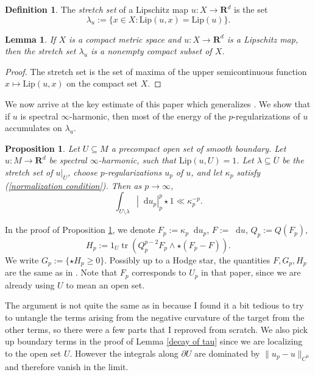 \documentclass[reqno,11pt]{amsart}
\newcommand{\RR}{\mathbf{R}}
\newcommand*\dif{\mathop{}\!\mathrm{d}}
\DeclareMathOperator{\tr}{tr}
\newcommand{\Lip}{\mathrm{Lip}}
\newcommand{\dfn}[1]{\emph{#1}\index{#1}}
\newtheorem{lemma}[theorem]{Lemma}
\newtheorem{proposition}[theorem]{Proposition}
\theoremstyle{definition}
\newtheorem{definition}[theorem]{Definition}
\numberwithin{equation}{section}
\begin{document}
\begin{definition}
The \dfn{stretch set} of a Lipschitz map $u: X \to \RR^d$ is the set 
$$\lambda_u := \{x \in X: \Lip(u, x) = \Lip(u)\}.$$
\end{definition}

\begin{lemma}\label{stretch set is compact}
If $X$ is a compact metric space and $u: X \to \RR^d$ is a Lipschitz map, then the stretch set $\lambda_u$ is a nonempty compact subset of $X$.
\end{lemma}
\begin{proof}
The stretch set is the set of maxima of the upper semicontinuous function $x \mapsto \Lip(u, x)$ on the compact set $X$.
\end{proof}

We now arrive at the key estimate of this paper which generalizes \cite[Proposition 6.5]{daskalopoulos2022transverse}.
We show that if $u$ is spectral $\infty$-harmonic, then most of the energy of the $p$-regularizations of $u$ accumulates on $\lambda_u$.

\begin{proposition}\label{main estimate}
Let $U \subseteq M$ a precompact open set of smooth boundary.
Let $u: M \to \RR^d$ be spectral $\infty$-harmonic, such that $\Lip(u, U) = 1$.
Let $\lambda \subseteq \overline U$ be the stretch set of $u|_{\overline U}$, choose $p$-regularizations $u_p$ of $u$, and let $\kappa_p$ satisfy (\ref{normalization condition}).
Then as $p \to \infty$,
\begin{equation}\label{decay}
\int_{U \setminus \lambda} |\dif u_p|_{p}^p \star 1 \ll \kappa_p^{-p}.
\end{equation}
\end{proposition}

In the proof of Proposition \ref{main estimate}, we denote $F_p := \kappa_p \dif u_p$, $F := \dif u$, $Q_p := Q(F_p)$,
$$H_p := 1_U \tr(Q_p^{p - 2} F_p \wedge \star(F_p - F)).$$
We write $G_p := \{\star H_p \geq 0\}$.
Possibly up to a Hodge star, the quantities $F, G_p, H_p$ are the same as in \cite[\S7]{daskalopoulos2022analytic}.
Note that $F_p$ corresponds to $U_p$ in that paper, since we are already using $U$ to mean an open set.

The argument is not quite the same as in \cite[\S7]{daskalopoulos2022analytic} because I found it a bit tedious to try to untangle the terms arising from the negative curvature of the target from the other terms, so there were a few parts that I reproved from scratch.
We also pick up boundary terms in the proof of Lemma \ref{decay of tau} since we are localizing to the open set $U$.
However the integrals along $\partial U$ are dominated by $\|u_p - u\|_{C^0}$ and therefore vanish in the limit.
\end{document}
